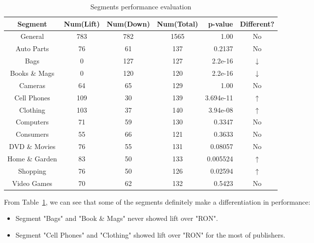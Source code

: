 \documentclass[12pt]{article}
\begin{document}
\begin{table}[ht!]
  \begin{center}
    \begin{tabular}{|c|c|c|c|r|c|}
      \hline
      Segment        & Num(Lift) & Num(Down) & Num(Total) & p-value   & Different?    \\ \hline
      General        &   783     &   782     &   1565     & 1.00      &  No           \\ \hline
      Auto Parts     &   76      &   61      &   137      & 0.2137    &  No           \\ \hline
      Bags           &   0       &   127     &   127      & 2.2e-16   &  $\downarrow$ \\ \hline
      Books \& Mags  &   0       &   120     &   120      & 2.2e-16   &  $\downarrow$ \\ \hline
      Cameras        &   64      &   65      &   129      & 1.00      &  No           \\ \hline
      Cell Phones    &   109     &   30      &   139      & 3.694e-11 &  $\uparrow$   \\ \hline
      Clothing       &   103     &   37      &   140      & 3.94e-08  &  $\uparrow$   \\ \hline
      Computers      &   71      &   59      &   130      & 0.3347    &  No           \\ \hline
      Consumers      &   55      &   66      &   121      & 0.3633    &  No           \\ \hline
      DVD \& Movies  &   76      &   55      &   131      & 0.08057   &  No           \\ \hline
      Home \& Garden &   83      &   50      &   133      & 0.005524  &  $\uparrow$   \\ \hline
      Shopping       &   76      &   50      &   126      & 0.02594   &  $\uparrow$   \\ \hline
      Video Games    &   70      &   62      &   132      & 0.5423    &  No           \\ \hline
    \end{tabular}
  \end{center}
  \caption{Segments performance evaluation \label{tab:p4}}
\end{table}

From Table~\ref{tab:p4}, we can see that some of the segments definitely make a differentiation in performance:

\begin{itemize}
  \item Segment "Bags" and "Book \& Mags" never showed lift over "RON".
  \item Segment "Cell Phones" and "Clothing" showed lift over "RON" for the most of publishers.
\end{itemize}
\end{document}
